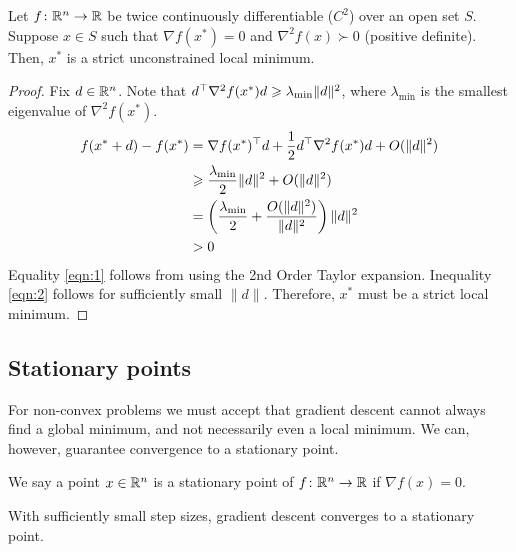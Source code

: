 \begin{proposition}
    Let $f\colon \mathbb{R}^n \to \mathbb{R}$ be twice continuously differentiable ($C^2$) over an open set $S$. Suppose $x \in S$ such that $\nabla f(x^*) = 0$ and $\nabla^2f(x) \succ 0$ (positive definite). Then, $x^*$ is a strict unconstrained local minimum.
\end{proposition}

\begin{proof}
Fix $d \in \mathbb{R}^n$. Note that $d^\top \nabla^2 f(x^*) d \geqslant \lambda_{\text{min}} \|d\|^2$, where $\lambda_\text{min}$ is the smallest eigenvalue of $\nabla^2 f(x^*)$.
\begin{align}
    f(x^* + d) - f(x^*) &= \nabla f(x^*)^\top d + \frac{1}{2}d^\top \nabla^2 f(x^*)d + O(\|d\|^2) \label{eqn:1}\\
    &\geqslant \frac{\lambda_{\text{min}}}{2} \|d\|^2 + O(\|d\|^2) \nonumber\\
    &= \left(\frac{\lambda_{\text{min}}}{2} + \frac{O(\|d\|^2)}{\|d\|^2}\right) \|d\|^2 \nonumber\\
    &> 0 \label{eqn:2}
\end{align}
Equality \ref{eqn:1} follows from using the 2nd Order Taylor expansion.
Inequality \ref{eqn:2} follows for sufficiently small $\|d\|$.
Therefore, $x^*$ must be a strict local minimum.
\end{proof}

\subsection{Stationary points}

For non-convex problems we must accept that gradient descent cannot always find
a global minimum, and not necessarily even a local minimum. We can, however,
guarantee convergence to a stationary point.

\begin{definition}
We say a point $x \in \mathbb{R}^n$ is a stationary point of $f\colon \mathbb{R}^n \to \mathbb{R}$ if
$\nabla f(x) = 0$.  
\end{definition}

\begin{proposition}
With sufficiently small step sizes, gradient descent 
converges to a stationary point. 
\end{proposition}

